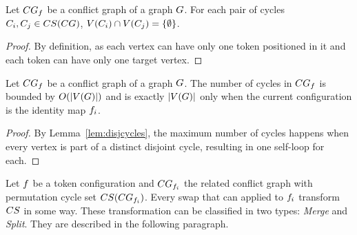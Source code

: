 \documentclass[msc]{ppgccufmg}    %
\begin{document}
\begin{lemma}
\label{lem:disjcycles}
Let $CG_{f}$ be a conflict graph of a graph $G$.
For each pair of cycles $C_{i},C_{j} \in CS(CG)$, $V(C_{i}) \cap V(C_{j}) =
\{\emptyset\}$.
\end{lemma}

\begin{proof}
By definition, as each vertex can have only one token positioned in it and 
each token can have only one target vertex.
\end{proof}

\begin{lemma}
\label{lem:cgbound}
Let $CG_{f}$ be a conflict graph of a graph $G$.
The number of cycles in $CG_{f}$ is bounded by 
$O(|V(G)|)$ and is exactly $|V(G)|$ only 
when the current configuration is the identity map $f_{i}$.
\end{lemma}

\begin{proof}
By Lemma~\ref{lem:disjcycles}, the maximum number of cycles happens when every 
vertex is part of a distinct disjoint cycle, resulting in one self-loop for 
each.
\end{proof}

Let $f$ be a token configuration and $CG_{
f_{i}}$ the related conflict graph with permutation cycle set 
$CS(CG_{f_{i}})$.
Every swap that can applied to $f_{i}$ transform $CS$ in some way.
These transformation can be classified in two types: \textit{Merge} and 
\textit{Split}.
They are described in the following paragraph.
\end{document}
